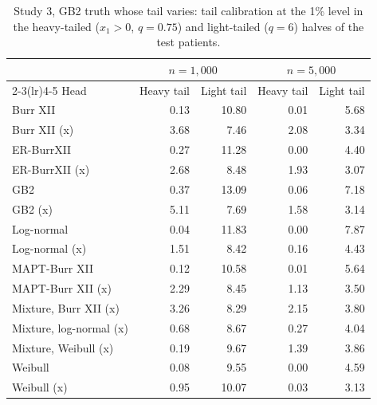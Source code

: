 \begin{table}[htbp]
\centering
\caption{Study 3, GB2 truth whose tail varies: tail calibration at the 1\% level in the heavy-tailed ($x_1 > 0$, $q = 0.75$) and light-tailed ($q = 6$) halves of the test patients.}\label{stab:network_halves}
\small
\begin{tabular}{lrrrr}
\toprule
& \multicolumn{2}{c}{$n = 1{,}000$} & \multicolumn{2}{c}{$n = 5{,}000$} \\
\cmidrule(lr){2-3}\cmidrule(lr){4-5}
Head & Heavy tail & Light tail & Heavy tail & Light tail \\
\midrule
Burr XII & 0.13 & 10.80 & 0.01 & 5.68 \\
Burr XII (x) & 3.68 & 7.46 & 2.08 & 3.34 \\
ER-BurrXII & 0.27 & 11.28 & 0.00 & 4.40 \\
ER-BurrXII (x) & 2.68 & 8.48 & 1.93 & 3.07 \\
GB2 & 0.37 & 13.09 & 0.06 & 7.18 \\
GB2 (x) & 5.11 & 7.69 & 1.58 & 3.14 \\
Log-normal & 0.04 & 11.83 & 0.00 & 7.87 \\
Log-normal (x) & 1.51 & 8.42 & 0.16 & 4.43 \\
MAPT-Burr XII & 0.12 & 10.58 & 0.01 & 5.64 \\
MAPT-Burr XII (x) & 2.29 & 8.45 & 1.13 & 3.50 \\
Mixture, Burr XII (x) & 3.26 & 8.29 & 2.15 & 3.80 \\
Mixture, log-normal (x) & 0.68 & 8.67 & 0.27 & 4.04 \\
Mixture, Weibull (x) & 0.19 & 9.67 & 1.39 & 3.86 \\
Weibull & 0.08 & 9.55 & 0.00 & 4.59 \\
Weibull (x) & 0.95 & 10.07 & 0.03 & 3.13 \\
\bottomrule
\end{tabular}

\par\vspace{0.3em}{\footnotesize (x): shape parameters predicted per patient.}
\end{table}
